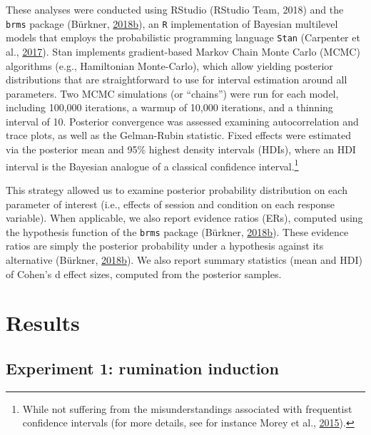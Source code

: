 \documentclass[a4paper,12pt,twoside,onecolumn,openright,final,oldfontcommands]{memoir}
\let\rmarkdownfootnote\footnote%
\def\footnote{\protect\rmarkdownfootnote}
\begin{document}
These analyses were conducted using RStudio (RStudio Team, 2018) and the \texttt{brms} package (Bürkner, \protect\hyperlink{ref-R-brms}{2018}\protect\hyperlink{ref-R-brms}{b}), an \texttt{R} implementation of Bayesian multilevel models that employs the probabilistic programming language \texttt{Stan} (Carpenter et al., \protect\hyperlink{ref-carpenter_stan_2017}{2017}). Stan implements gradient-based Markov Chain Monte Carlo (MCMC) algorithms (e.g., Hamiltonian Monte-Carlo), which allow yielding posterior distributions that are straightforward to use for interval estimation around all parameters. Two MCMC simulations (or \enquote{chains}) were run for each model, including 100,000 iterations, a warmup of 10,000 iterations, and a thinning interval of 10. Posterior convergence was assessed examining autocorrelation and trace plots, as well as the Gelman-Rubin statistic. Fixed effects were estimated via the posterior mean and 95\% highest density intervals (HDIs), where an HDI interval is the Bayesian analogue of a classical confidence interval.\footnote{While not suffering from the misunderstandings associated with frequentist confidence intervals (for more details, see for instance Morey et al., \protect\hyperlink{ref-morey_fallacy_2015}{2015}).}

This strategy allowed us to examine posterior probability distribution on each parameter of interest (i.e., effects of session and condition on each response variable). When applicable, we also report evidence ratios (ERs), computed using the hypothesis function of the \texttt{brms} package (Bürkner, \protect\hyperlink{ref-R-brms}{2018}\protect\hyperlink{ref-R-brms}{b}). These evidence ratios are simply the posterior probability under a hypothesis against its alternative (Bürkner, \protect\hyperlink{ref-R-brms}{2018}\protect\hyperlink{ref-R-brms}{b}). We also report summary statistics (mean and HDI) of Cohen's d effect sizes, computed from the posterior samples.

\hypertarget{results}{%
\section{Results}\label{results}}

\hypertarget{experiment-1-rumination-induction-1}{%
\subsection{Experiment 1: rumination induction}\label{experiment-1-rumination-induction-1}}
\end{document}
